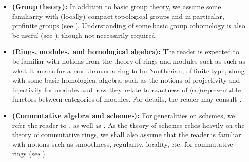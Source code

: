         \begin{convention} \label{conv: algebraic_geometry}
            \noindent
            \begin{itemize}
                \item \textbf{(Group theory):} In addition to basic group theory, we assume some familiarity with (locally) compact topological groups and in particular, profinite groups (see \cite[Section I.1]{neukirch_1999_cohomology_of_number_field}). Understanding of some basic group cohomology is also be useful (see \cite[Chapter VI]{hilton_stammbach_homological_algebra}), though not necessarily required.
                \item \textbf{(Rings, modules, and homological algebra):} The reader is expected to be familiar with notions from the theory of rings and modules such as such as what it means for a module over a ring to be Noetherian, of finite type, along with some basic homological algebra, such as the notions of projectivity and injectivity for modules and how they relate to exactness of (co)representable functors between categories of modules. For details, the reader may consult \cite{chapter0}.
                \item \textbf{(Commutative algebra and schemes):} For generalities on schemes, we refer the reader to \cite[Chapters II and III]{hartshorne}, as well as \cite[\href{https://stacks.math.columbia.edu/tag/01H8}{Tag 01H8}, \href{https://stacks.math.columbia.edu/tag/01QL}{Tag 01QL}, and \href{https://stacks.math.columbia.edu/tag/0209}{Tag 0209}]{stacks}. As the theory of schemes relies heavily on the theory of commutative rings, we shall also assume that the reader is familiar with notions such as smoothness, regularity, locality, etc. for commutative rings (see \cite[\href{https://stacks.math.columbia.edu/tag/00AO}{Tag 00AO}]{stacks}).
                

\end{itemize}
\end{convention}

